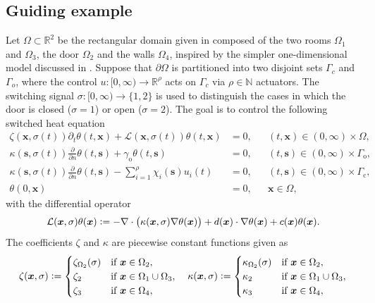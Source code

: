 \documentclass[reqno]{amsart}
\newcommand{\bx}{{\bm x}}
\newcommand{\bs}{{\bm s}}
\newcommand{\R}{\mathbb R}
\newcommand{\N}{\mathbb N}
\newcommand{\state}{\theta}
\newcommand{\inpVar}{u}
\newcommand{\inpVarDim}{\rho}
\newcommand{\difOper}{\calL}
\newcommand{\switch}{\sigma}
\newcommand{\advection}{d}
\newcommand{\calL}{\mathcal{L}}
\begin{document}
\subsection{Guiding example}
\label{subsection:example}
%
Let $\Omega\subset \R^{2}$ be the rectangular domain given in  composed of the two rooms $\Omega_1$ and $\Omega_3$, the door $\Omega_2$ and the walls $\Omega_4$, inspired by the simpler one-dimensional model discussed in \cite{SchU18}. Suppose that $\partial \Omega$ is partitioned into two disjoint sets $\Gamma_c$ and $\Gamma_o$, where the control $u\colon[0,\infty)\to\R^{\inpVarDim}$ acts on $\Gamma_c$ via $\inpVarDim\in\N$ actuators. The switching signal $\switch\colon[0,\infty)\to \{1,2\}$ is used to distinguish the cases in which the door is closed ($\switch = 1$) or open ($\switch=2$). 
The goal is to control the following switched heat equation
%
\begin{subequations}
    \label{eq: parabolic_problem}
    \begin{align}
       \label{eq: parabolic_problem-a}
	   \zeta(\bx,\switch(t))\partial_t \state(t,\bx) + \difOper(\bx,\switch(t)) \state(t,\bx)&= 0, && (t,\bx) \in (0,\infty)\times\Omega,\\
       \kappa(\bs,\switch(t)) \tfrac{\partial}{\partial n}\state(t,\bs) + \gamma_{\mathrm{o}}\state(t,\bs)&= 0, && (t,\bs) \in (0,\infty) \times \Gamma_{\mathrm{o}},\\
	   \kappa(\bs,\switch(t)) \tfrac{\partial}{\partial n}\state(t,\bs) - \sum\nolimits_{i=1}^{\inpVarDim} \chi_i(\bs) \inpVar_i(t)&=0, && (t,\bs) \in (0,\infty) \times \Gamma_{\mathrm{c}},\\
	   \theta(0,\bx) &= 0, && \bx \in \Omega,
    \end{align}
\end{subequations}
%
with the differential operator
%
\begin{align*}
    \difOper(\bx,\switch)\state(\bx)\vcentcolon=-\nabla \cdot\big(\kappa(\bx,\sigma)\nabla \state(\bx)\big) + \advection(\bx)\cdot\nabla\state(\bx) + c(\bx)\state(\bx).
\end{align*}
%
The coefficients $\zeta$ and $\kappa$ are piecewise constant functions given as
%
\begin{align*}
    \zeta(\bx, \switch)\vcentcolon=
    \begin{cases}
        \zeta_{{\Omega_2}}(\switch)&\text{if }\bx\in \Omega_2,\\
        \zeta_2&\text{if }\bx\in\Omega_1\cup\Omega_3,\\
        \zeta_3&\text{if }\bx\in\Omega_4,
	\end{cases} \quad
    \kappa(\bx, \switch)\vcentcolon= 
    \begin{cases}
        \kappa_{\Omega_2}(\switch)&\text{if }\bx\in \Omega_2,\\
        \kappa_2&\text{if }\bx\in \Omega_1 \cup \Omega_3,\\
        \kappa_3&\text{if }\bx\in \Omega_4,
	\end{cases}
\end{align*}
\end{document}
